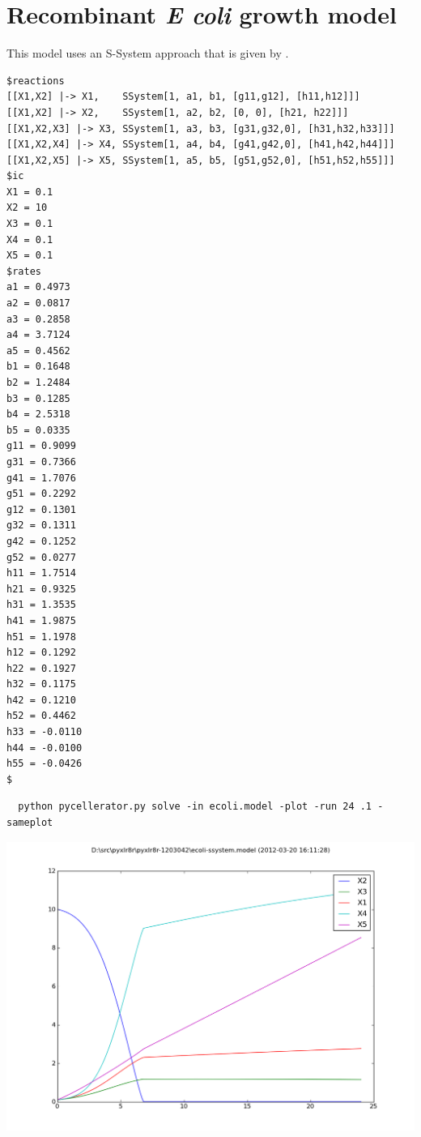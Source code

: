 \clearpage
\section{Recombinant \textit{E coli} growth model}

This model uses an S-System approach that is given by \cite{ecoli}.

\begin{lstlisting}
$reactions
[[X1,X2] |-> X1,    SSystem[1, a1, b1, [g11,g12], [h11,h12]]]
[[X1,X2] |-> X2,    SSystem[1, a2, b2, [0, 0], [h21, h22]]]
[[X1,X2,X3] |-> X3, SSystem[1, a3, b3, [g31,g32,0], [h31,h32,h33]]]
[[X1,X2,X4] |-> X4, SSystem[1, a4, b4, [g41,g42,0], [h41,h42,h44]]]
[[X1,X2,X5] |-> X5, SSystem[1, a5, b5, [g51,g52,0], [h51,h52,h55]]]
$ic
X1 = 0.1
X2 = 10
X3 = 0.1
X4 = 0.1
X5 = 0.1
$rates
a1 = 0.4973
a2 = 0.0817
a3 = 0.2858
a4 = 3.7124
a5 = 0.4562
b1 = 0.1648
b2 = 1.2484
b3 = 0.1285
b4 = 2.5318
b5 = 0.0335
g11 = 0.9099
g31 = 0.7366
g41 = 1.7076
g51 = 0.2292
g12 = 0.1301
g32 = 0.1311
g42 = 0.1252
g52 = 0.0277
h11 = 1.7514
h21 = 0.9325
h31 = 1.3535
h41 = 1.9875
h51 = 1.1978
h12 = 0.1292
h22 = 0.1927
h32 = 0.1175
h42 = 0.1210
h52 = 0.4462
h33 = -0.0110
h44 = -0.0100
h55 = -0.0426
$
\end{lstlisting}



\begin{lstlisting}
  python pycellerator.py solve -in ecoli.model -plot -run 24 .1 -sameplot
\end{lstlisting}

\begin{center}
\includegraphics[width=.7\textwidth]{ecoli-ssystem.png}
\end{center}

\clearpage


